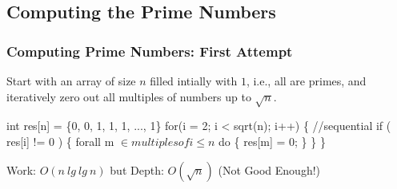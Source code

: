 \documentclass{beamer}
\renewcommand{\emph}[1]{\textcolor{structure}{#1}}
\newcommand{\emp}[1]{\textcolor{DikuRed}{ #1}}
\newcommand{\mymath}[1]{$ #1 $}
\begin{document}
\subsection{Computing the Prime Numbers}

\begin{frame}[fragile,t]
  \frametitle{Computing Prime Numbers: First Attempt}

Start with an array of size $n$ filled intially with $1$,
i.e., all are primes, and iteratively zero out all multiples
of numbers up to $\sqrt{n}$.
\bigskip

\begin{colorcode}
int res[n] = \{0, 0, 1, 1, 1, ..., 1\}
for(i = 2; i < sqrt(n); i++) \{  \alert{//sequential}
    if ( res[i] != 0 ) \{
        \emph{forall m \mymath{\in multiples of i \leq n} do} \{
             res[m] = 0;
        \}
    \}
\}
\end{colorcode}
\bigskip

\emph{Work: $O(n \ lg \ lg \ n)$} but \emp{Depth: $O(\sqrt{n})$ (Not Good Enough!)}

\end{frame}
\end{document}

